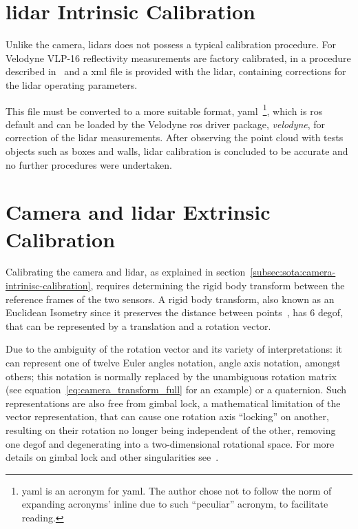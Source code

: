 	

\section{\ac{lidar} Intrinsic Calibration}
Unlike the camera, \acp{lidar} does not possess a typical calibration procedure. For Velodyne VLP-16 reflectivity measurements are factory calibrated, in a procedure described in~\cite{vlp16} and a \ac{xml} file is provided with the \ac{lidar}, containing corrections for the \ac{lidar} operating parameters.

This file must be converted to a more suitable format, \acs{yaml}~\footnote{\acs{yaml} is an acronym for \acl{yaml}. The author chose not to follow the norm of expanding acronyms' inline due to such  ``peculiar'' acronym, to facilitate reading.}, which is \ac{ros} default and can be loaded by the Velodyne \ac{ros} driver package, \emph{velodyne}, for correction of the \ac{lidar} measurements. After observing the point cloud with tests objects such as boxes and walls, \ac{lidar} calibration is concluded to be accurate and no further procedures were undertaken.

\section{Camera and \ac{lidar} Extrinsic Calibration}
Calibrating the camera and \ac{lidar}, as explained in section~\ref{subsec:sota:camera-intrinisc-calibration}, requires determining the rigid body transform between the reference frames of the two sensors. A rigid body transform, also known as an Euclidean Isometry since it preserves the distance between points~\cite{mvg_book}, has 6 \ac{degof}, that can be represented by a translation and a rotation vector.

Due to the ambiguity of the rotation vector and its variety of interpretations: it can represent one of twelve Euler angles notation, angle axis notation, amongst others; this notation is normally replaced by the unambiguous rotation matrix (see equation~\ref{eq:camera_transform_full} for an example) or a quaternion. Such representations are also free from gimbal lock, a mathematical limitation of the vector representation, that can cause one rotation axis ``locking'' on another, resulting on their rotation no longer being independent of the other, removing one \ac{degof} and degenerating into a two-dimensional rotational space. For more details on gimbal lock and other singularities see~\cite{mvg_book, Slabaugh, camera_models}.

